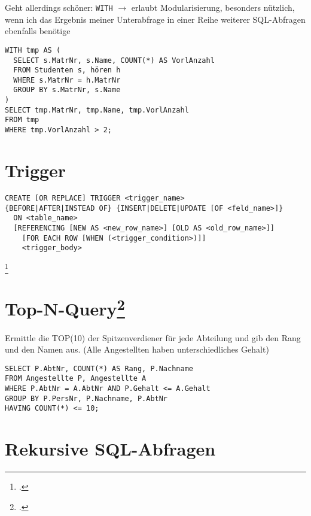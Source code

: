 \documentclass{lehramt-informatik-haupt}
\begin{document}
\noindent
Geht allerdings schöner: \verb|WITH| $\rightarrow$ erlaubt
Modularisierung, besonders nützlich, wenn ich das Ergebnis meiner
Unterabfrage in einer Reihe weiterer SQL-Abfragen ebenfalls benötige

\begin{verbatim}
WITH tmp AS (
  SELECT s.MatrNr, s.Name, COUNT(*) AS VorlAnzahl
  FROM Studenten s, hören h
  WHERE s.MatrNr = h.MatrNr
  GROUP BY s.MatrNr, s.Name
)
SELECT tmp.MatrNr, tmp.Name, tmp.VorlAnzahl
FROM tmp
WHERE tmp.VorlAnzahl > 2;
\end{verbatim}

\section{Trigger}

\begin{verbatim}
CREATE [OR REPLACE] TRIGGER <trigger_name>
{BEFORE|AFTER|INSTEAD OF} {INSERT|DELETE|UPDATE [OF <feld_name>]}
  ON <table_name>
  [REFERENCING [NEW AS <new_row_name>] [OLD AS <old_row_name>]]
    [FOR EACH ROW [WHEN (<trigger_condition>)]]
    <trigger_body>
\end{verbatim}
\footcite{wiki:datenbanktrigger}

%

\section{Top-N-Query\footcite[Seite 8]{db:fs:3}}

Ermittle die TOP(10) der Spitzenverdiener für jede Abteilung und gib
den Rang und den Namen aus. (Alle Angestellten haben
unterschiedliches Gehalt)

\begin{verbatim}
SELECT P.AbtNr, COUNT(*) AS Rang, P.Nachname
FROM Angestellte P, Angestellte A
WHERE P.AbtNr = A.AbtNr AND P.Gehalt <= A.Gehalt
GROUP BY P.PersNr, P.Nachname, P.AbtNr
HAVING COUNT(*) <= 10;
\end{verbatim}

%

\section{Rekursive SQL-Abfragen}
\end{document}
